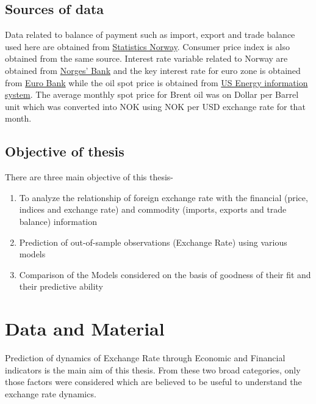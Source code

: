 \documentclass[12pt, lot, lof]{thesis}\usepackage[]{graphicx}\usepackage[]{color}
\begin{document}
\section{Sources of data}
\label{sec:datasouce}
Data related to balance of payment such as import, export and trade balance used here are obtained from \href{http://ssb.no}{Statistics Norway}. Consumer price index is also obtained from the same source. Interest rate variable related to Norway are obtained from \href{http://www.norges-bank.no/en/Statistics/Interest-rates/Key-policy-rate-monthly/}{Norges' Bank} and the key interest rate for euro zone is obtained from \href{http://ec.europa.eu/eurostat/web/interest-rates/database}{Euro Bank} while the oil spot price is obtained from \href{http://www.eia.gov/dnav/pet/pet_pri_spt_s1_m.htm}{US Energy information system}. The average monthly spot price for Brent oil was on Dollar per Barrel unit which was converted into NOK using NOK per USD exchange rate for that month.

\section{Objective of thesis}
\label{sec:objective}
There are three main objective of this thesis-
\begin{enumerate}
\item To analyze the relationship of foreign exchange rate with the financial (price, indices and exchange rate) and commodity (imports, exports and trade balance) information
\item Prediction of out-of-sample observations (Exchange Rate) using various models
\item Comparison of the Models considered on the basis of goodness of their fit and their predictive ability
\end{enumerate}



\chapter{Data and Material}
\label{ch:DataMaterial}
Prediction of dynamics of Exchange Rate through Economic and Financial indicators is the main aim of this thesis. From these two broad categories, only those factors were considered which are believed to be useful to understand the exchange rate dynamics.
\end{document}
